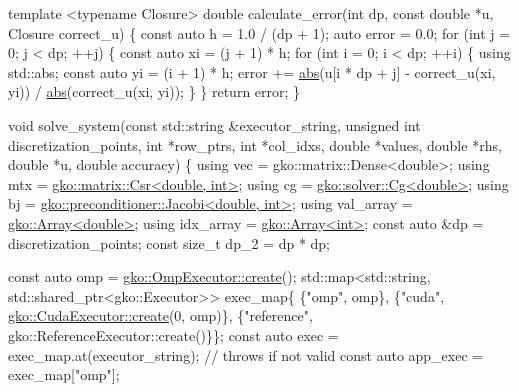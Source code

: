 \begin{DoxyCodeInclude}
\textcolor{keyword}{template} <\textcolor{keyword}{typename} Closure>
\textcolor{keywordtype}{double} calculate\_error(\textcolor{keywordtype}{int} dp, \textcolor{keyword}{const} \textcolor{keywordtype}{double} *u, Closure correct\_u)
\{
    \textcolor{keyword}{const} \textcolor{keyword}{auto} h = 1.0 / (dp + 1);
    \textcolor{keyword}{auto} error = 0.0;
    \textcolor{keywordflow}{for} (\textcolor{keywordtype}{int} j = 0; j < dp; ++j) \{
        \textcolor{keyword}{const} \textcolor{keyword}{auto} xi = (j + 1) * h;
        \textcolor{keywordflow}{for} (\textcolor{keywordtype}{int} i = 0; i < dp; ++i) \{
            \textcolor{keyword}{using} std::abs;
            \textcolor{keyword}{const} \textcolor{keyword}{auto} yi = (i + 1) * h;
            error +=
                \hyperlink{namespacegko_a57797fc0a00fd4b7ff34ca4bfc84bc51}{abs}(u[i * dp + j] - correct\_u(xi, yi)) / \hyperlink{namespacegko_a57797fc0a00fd4b7ff34ca4bfc84bc51}{abs}(correct\_u(xi, yi));
        \}
    \}
    \textcolor{keywordflow}{return} error;
\}


\textcolor{keywordtype}{void} solve\_system(\textcolor{keyword}{const} std::string &executor\_string,
                  \textcolor{keywordtype}{unsigned} \textcolor{keywordtype}{int} discretization\_points, \textcolor{keywordtype}{int} *row\_ptrs,
                  \textcolor{keywordtype}{int} *col\_idxs, \textcolor{keywordtype}{double} *values, \textcolor{keywordtype}{double} *rhs, \textcolor{keywordtype}{double} *u,
                  \textcolor{keywordtype}{double} accuracy)
\{
    \textcolor{keyword}{using} vec = gko::matrix::Dense<double>;
    \textcolor{keyword}{using} mtx = \hyperlink{classgko_1_1matrix_1_1Csr}{gko::matrix::Csr<double, int>};
    \textcolor{keyword}{using} cg = \hyperlink{classgko_1_1solver_1_1Cg}{gko::solver::Cg<double>};
    \textcolor{keyword}{using} bj = \hyperlink{classgko_1_1preconditioner_1_1Jacobi}{gko::preconditioner::Jacobi<double, int>};
    \textcolor{keyword}{using} val\_array = \hyperlink{classgko_1_1Array}{gko::Array<double>};
    \textcolor{keyword}{using} idx\_array = \hyperlink{classgko_1_1Array}{gko::Array<int>};
    \textcolor{keyword}{const} \textcolor{keyword}{auto} &dp = discretization\_points;
    \textcolor{keyword}{const} \textcolor{keywordtype}{size\_t} dp\_2 = dp * dp;

    \textcolor{keyword}{const} \textcolor{keyword}{auto} omp = \hyperlink{classgko_1_1OmpExecutor_a33ca05fdd0fc928ee262fc9425304874}{gko::OmpExecutor::create}();
    std::map<std::string, std::shared\_ptr<gko::Executor>> exec\_map\{
        \{\textcolor{stringliteral}{"omp"}, omp\},
        \{\textcolor{stringliteral}{"cuda"}, \hyperlink{classgko_1_1CudaExecutor_a2718a92034350650ef406ffdb60db090}{gko::CudaExecutor::create}(0, omp)\},
        \{\textcolor{stringliteral}{"reference"}, gko::ReferenceExecutor::create()\}\};
    \textcolor{keyword}{const} \textcolor{keyword}{auto} exec = exec\_map.at(executor\_string);  \textcolor{comment}{// throws if not valid}
    \textcolor{keyword}{const} \textcolor{keyword}{auto} app\_exec = exec\_map[\textcolor{stringliteral}{"omp"}];



\end{DoxyCodeInclude}
